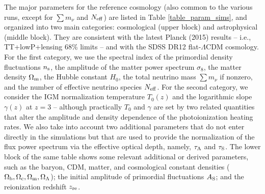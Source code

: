 \documentclass{emulateapj}
\begin{document}
The major parameters for the reference cosmology (also common to the various runs, except for $\sum m_{\nu}$ and $N_{\rm eff}$) 
are listed in Table \ref{table_param_sims}, and  organized into two main categories: cosmological (upper block) and astrophysical (middle block). They are consistent with the latest 
Planck (2015) results -- i.e., TT+lowP+lensing 68\% limits -- and with the SDSS DR12 flat-$\Lambda$CDM cosmology.  
For the first category, we use the spectral index of the
primordial density fluctuations $n_{\rm s}$, the amplitude of the
matter power spectrum $\sigma_8$, the matter density
$\Omega_{\rm m}$, the Hubble constant $H_0$, 
the total neutrino mass $\sum m_{\nu}$  if nonzero, and 
the number of effective neutrino species $N_{\rm eff}$. 
For the second category, we consider the IGM normalization temperature $T_0(z)$
and the logarithmic slope $\gamma(z)$ at $z=3$ -- although practically 
$T_0$ and $\gamma$ are 
set by two related quantities that alter the amplitude and density dependence of the photoionization heating rates. 
We also take into account two additional parameters that do not enter directly in the simulations but that are used to provide the normalization of the flux power spectrum via the effective optical depth, 
namely, $\tau_{\rm A}$ and $\tau_{\rm S}$.
The lower block of the same table shows some relevant additional or derived parameters, such as
the baryon, CDM, matter, and cosmological constant  densities ($\Omega_{\rm b}, \Omega_{\rm c}, \Omega_{\rm m}, \Omega_{\Lambda}$); 
 the initial amplitude of primordial fluctuations $A_{\rm S}$; and the reionization redshift $z_{\rm re}$.  

\end{document}
